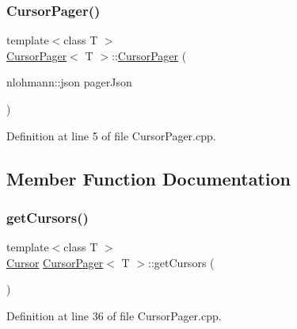 \mbox{\label{class_cursor_pager_a945f2a56e865cd5fabb38ab674fa1999}} 
\subsubsection{\texorpdfstring{Cursor\+Pager()}{CursorPager()}\hspace{0.1cm}{\footnotesize\ttfamily [2/2]}}
{\footnotesize\ttfamily template$<$class T $>$ \\
\mbox{\hyperlink{class_cursor_pager}{Cursor\+Pager}}$<$ T $>$\+::\mbox{\hyperlink{class_cursor_pager}{Cursor\+Pager}} (\begin{DoxyParamCaption}\item[{nlohmann\+::json}]{pager\+Json }\end{DoxyParamCaption})}



Definition at line 5 of file Cursor\+Pager.\+cpp.



\subsection{Member Function Documentation}
\mbox{\label{class_cursor_pager_af019ca0742e31c7e5c41eb1baf7b71eb}} 
\subsubsection{\texorpdfstring{get\+Cursors()}{getCursors()}}
{\footnotesize\ttfamily template$<$class T $>$ \\
\mbox{\hyperlink{class_cursor}{Cursor}} \mbox{\hyperlink{class_cursor_pager}{Cursor\+Pager}}$<$ T $>$\+::get\+Cursors (\begin{DoxyParamCaption}{ }\end{DoxyParamCaption})}



Definition at line 36 of file Cursor\+Pager.\+cpp.

\mbox{\label{class_cursor_pager_a47e9d35657bb8dd1f9b774946e7d7bac}} 

